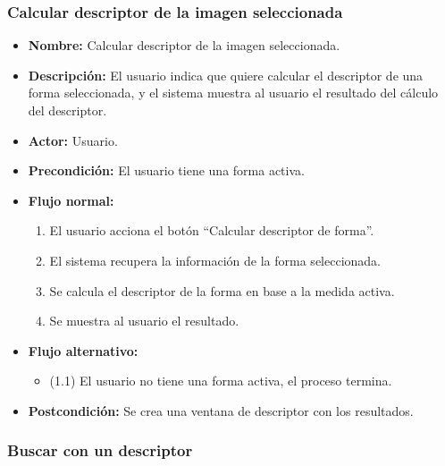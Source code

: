 \newpage

\subsubsection{Calcular descriptor de la imagen seleccionada}

\begin{itemize}
\item \textbf{Nombre: }Calcular descriptor de la imagen seleccionada.
\item \textbf{Descripción: }El usuario indica que quiere calcular el descriptor de una forma seleccionada, y el sistema muestra al usuario el resultado del cálculo del descriptor.
\item \textbf{Actor: }Usuario.
\item \textbf{Precondición: }El usuario tiene una forma activa.
\item \textbf{Flujo normal: }
\begin{enumerate}
\item El usuario acciona el botón ``Calcular descriptor de forma''.
\item El sistema recupera la información de la forma seleccionada.
\item Se calcula el descriptor de la forma en base a la medida activa.
\item Se muestra al usuario el resultado.
\end{enumerate}
\item \textbf{Flujo alternativo:}
\begin{itemize}
\item (1.1) El usuario no tiene una forma activa, el proceso termina.
\end{itemize}
\item \textbf{Postcondición: }Se crea una ventana de descriptor con los resultados.
\end{itemize}

\newpage

\subsubsection{Buscar con un descriptor}

